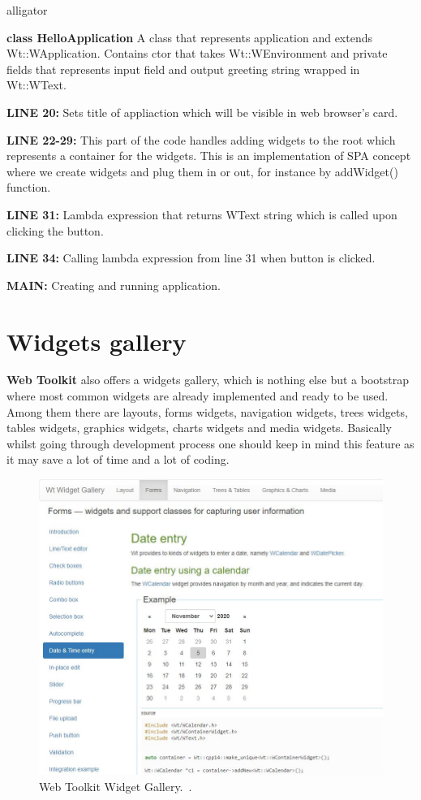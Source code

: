 \documentclass[a4paper,12pt]{book}
\newcommand\tab[1][1cm]{\hspace*{#1}}
\begin{document}
{{\begin{labeling}{alligator}
\item [\textbf{class HelloApplication}] A class that represents application and extends Wt::WApplication. Contains ctor that takes Wt::WEnvironment and private fields that represents input field and output greeting string wrapped in Wt::WText.
\item [\textbf{LINE 20:}] Sets title of appliaction which will be visible in web browser's card.
\item [\textbf{LINE 22-29:}] This part of the code handles adding widgets to the root which represents a container for the widgets. This is an implementation of SPA concept where we create widgets and plug them in or out, for instance by addWidget() function.
\item [\textbf{LINE 31:}] Lambda expression that returns WText string which is called upon clicking the button.
\item [\textbf{LINE 34:}] Calling lambda expression from line 31 when button is clicked.
\item [\textbf{MAIN:}] Creating and running application.
\end{labeling} 


}
\section{Widgets gallery}
{
\tab \textbf{Web Toolkit} also offers a widgets gallery, which is nothing else but a bootstrap where most common widgets are already implemented and ready to be used. Among them there are layouts, forms widgets, navigation widgets, trees widgets, tables widgets, graphics widgets, charts widgets and media widgets. Basically whilst going through development process one should keep in mind this feature as it may save a lot of time and a lot of coding. 

\bigskip
\begin{figure}[h]
  \centering
    \includegraphics[width=1.0\textwidth]{gallery}
    \caption{Web Toolkit Widget Gallery.~\cite{widgetsgallery}.}
\end{figure}
    
}}
\end{document}
